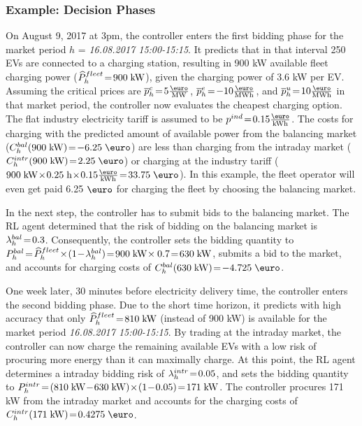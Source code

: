 \documentclass[a4paper, 12pt]{article}
\begin{document}
\subsubsection{Example: Decision Phases}
\label{sec:orgba89a72}
On August 9, 2017 at 3pm, the controller enters the first bidding phase for the
market period \(h\) = \emph{16.08.2017 15:00-15:15}. It predicts that in that interval
250 EVs are connected to a charging station, resulting in 900 kW available fleet
charging power (\(\widehat{P}^{fleet}_{h}\!=\!900\;\text{kW}\)), given the charging power of 3.6 kW
per EV. Assuming the critical prices are \(\ccp{h}\!=\!5\emw\),
\(\cep{h}\!=\!-10\emwh\), and \(\cup{h}\!=\!10\emwh\) in that market period, the
controller now evaluates the cheapest charging option. The flat industry
electricity tariff is assumed to be \(p^{ind}\!=\!0.15\ekwh\). The costs for
charging with the predicted amount of available power from the balancing market
(\(\Cb{h}(900\;\kw)\!=\!-6.25\;\eur\)) are less than charging from the intraday
market (\(\Ci{h}(900\;\kw)\!=\!2.25\;\eur\)) or charging at the industry tariff
(\(900\;\kw\!\times\!0.25\;\text{h}\!\times\!0.15\ekwh\!=\!33.75\;\eur\)). In this
example, the fleet operator will even get paid 6.25 \(\eur\) for charging the
fleet by choosing the balancing market.

In the next step, the controller has to submit bids to the balancing market. The
RL agent determined that the risk of bidding on the balancing market is
\(\lambda^{bal}_{h}\!=\!0.3\). Consequently, the controller sets the bidding quantity to
\(\Pb{h}\!=\!\fPhat{h}\!\times\!(1\!-\!\lb{h})\!=\!900\;\kw\!\times0.7\!=\!630\;\kw\),
submits a bid to the market, and accounts for charging costs of
\(\Cb{h}(630\;\kw)\!=\!-4.725\;\eur\).

One week later, 30 minutes before electricity delivery time, the controller
enters the second bidding phase. Due to the short time horizon, it predicts with
high accuracy that only \(\widehat{P}^{fleet}_{h}\!=\!810\;\text{kW}\) (instead of 900 kW) is
available for the market period \emph{16.08.2017 15:00-15:15}. By trading at the
intraday market, the controller can now charge the remaining available EVs with
a low risk of procuring more energy than it can maximally charge. At this point,
the RL agent determines a intraday bidding risk of \(\lambda^{intr}_{h}\!=\!0.05\), and sets
the bidding quantity to
\(\Pi{h}\!=\!(810\;\kw\!-\!630\;\kw)\!\times\!(1\!-\!0.05)\!=\!171\;\kw\). The
controller procures 171 kW from the intraday market and accounts for the
charging costs of \(\Ci{h}(171\;\kw)\!=\!0.4275\;\eur\).
\end{document}
